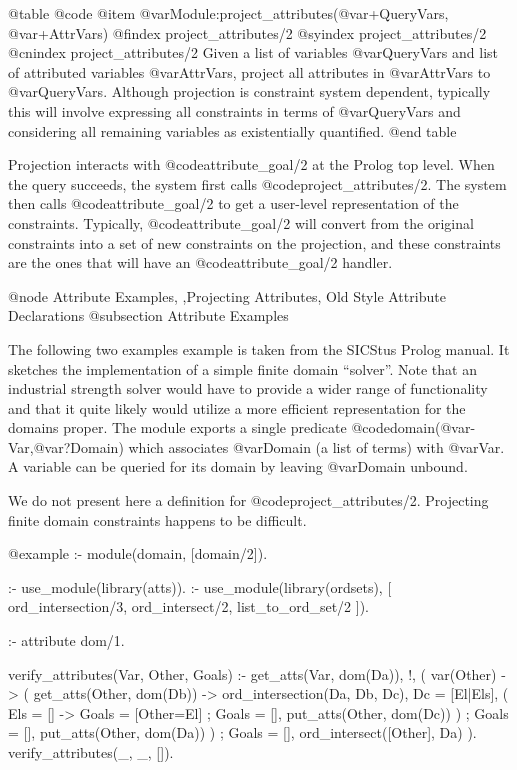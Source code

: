 @table @code
@item @var{Module}:project_attributes(@var{+QueryVars}, @var{+AttrVars})
@findex project_attributes/2
@syindex project_attributes/2
@cnindex project_attributes/2
Given a list of variables @var{QueryVars} and list of attributed
variables @var{AttrVars}, project all attributes in @var{AttrVars} to
@var{QueryVars}. Although projection is constraint system dependent,
typically this will involve expressing all constraints in terms of
@var{QueryVars} and considering all remaining variables as existentially
quantified.
@end table

Projection interacts with @code{attribute_goal/2} at the Prolog top
level. When the query succeeds, the system first calls
@code{project_attributes/2}. The system then calls
@code{attribute_goal/2} to get a user-level representation of the
constraints. Typically, @code{attribute_goal/2} will convert from the
original constraints into a set of new constraints on the projection,
and these constraints are the ones that will have an
@code{attribute_goal/2} handler.

@node Attribute Examples, ,Projecting Attributes, Old Style Attribute Declarations
@subsection Attribute Examples

The following two examples example is taken from the SICStus Prolog manual. It
sketches the implementation of a simple finite domain ``solver''.  Note
that an industrial strength solver would have to provide a wider range
of functionality and that it quite likely would utilize a more efficient
representation for the domains proper.  The module exports a single
predicate @code{domain(@var{-Var},@var{?Domain})} which associates
@var{Domain} (a list of terms) with @var{Var}.  A variable can be
queried for its domain by leaving @var{Domain} unbound.

We do not present here a definition for @code{project_attributes/2}.
Projecting finite domain constraints happens to be difficult.


@example
:- module(domain, [domain/2]).

:- use_module(library(atts)).
:- use_module(library(ordsets), [
        ord_intersection/3,
        ord_intersect/2,
        list_to_ord_set/2
   ]).

:- attribute dom/1.

verify_attributes(Var, Other, Goals) :-
        get_atts(Var, dom(Da)), !,          %
        (   var(Other) ->                   %
            (   get_atts(Other, dom(Db)) -> %
                ord_intersection(Da, Db, Dc),
                Dc = [El|Els],              %
                (   Els = [] ->             %
                    Goals = [Other=El]      %
                ;   Goals = [],
                    put_atts(Other, dom(Dc))%
                )
            ;   Goals = [],
                put_atts(Other, dom(Da))    %
            )
        ;   Goals = [],
            ord_intersect([Other], Da)      %
        ).
verify_attributes(_, _, []).                %

